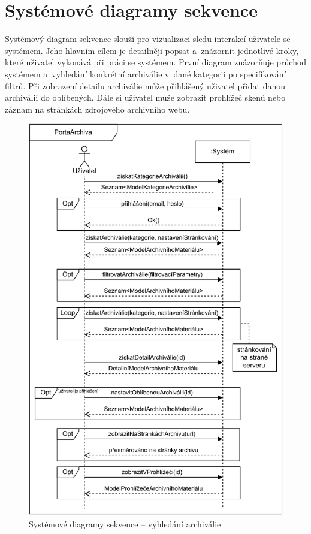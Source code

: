 \newpage
\section{Systémové diagramy sekvence}
Systémový diagram sekvence \cite{systemSequenceDiagram} slouží pro vizualizaci sledu interakcí uživatele se systémem. Jeho hlavním cílem je detailněji popsat a~znázornit jednotlivé kroky, které uživatel vykonává při práci se systémem.
\newpara
První diagram znázorňuje průchod systémem a~vyhledání konkrétní archiválie v~dané kategorii po specifikování filtrů. Při zobrazení detailu archiválie může přihlášený uživatel přidat danou archiválii do oblíbených. Dále si uživatel může zobrazit prohlížeč skenů nebo záznam na stránkách zdrojového archivního webu.
\begin{figure}[htbp]
\centering
    \includegraphics[scale=.8]{obrazky-figures/specification/SSD_find_archival_material.pdf}
    \caption{Systémové diagramy sekvence – vyhledání archiválie}
\end{figure}

